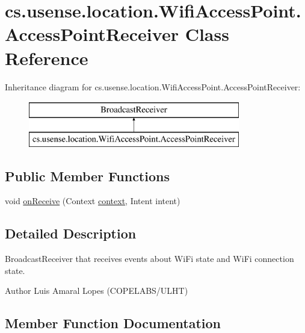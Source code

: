 \hypertarget{classcs_1_1usense_1_1location_1_1_wifi_access_point_1_1_access_point_receiver}{}\section{cs.\+usense.\+location.\+Wifi\+Access\+Point.\+Access\+Point\+Receiver Class Reference}
\label{classcs_1_1usense_1_1location_1_1_wifi_access_point_1_1_access_point_receiver}
Inheritance diagram for cs.\+usense.\+location.\+Wifi\+Access\+Point.\+Access\+Point\+Receiver\+:\begin{figure}[H]
\begin{center}
\leavevmode
\includegraphics[height=2.000000cm]{classcs_1_1usense_1_1location_1_1_wifi_access_point_1_1_access_point_receiver}
\end{center}
\end{figure}
\subsection*{Public Member Functions}
\begin{DoxyCompactItemize}
\item 
void \hyperlink{classcs_1_1usense_1_1location_1_1_wifi_access_point_1_1_access_point_receiver_a839a8d372beffef68220da9bf47dd39e}{on\+Receive} (Context \hyperlink{classcs_1_1usense_1_1location_1_1_wifi_access_point_a915b21207eb4aaed1293221cd1fc5b19}{context}, Intent intent)
\end{DoxyCompactItemize}


\subsection{Detailed Description}
Broadcast\+Receiver that receives events about Wi\+Fi state and Wi\+Fi connection state. \begin{DoxyAuthor}{Author}
Luis Amaral Lopes (C\+O\+P\+E\+L\+A\+B\+S/\+U\+L\+H\+T) 
\end{DoxyAuthor}


\subsection{Member Function Documentation}
\hypertarget{classcs_1_1usense_1_1location_1_1_wifi_access_point_1_1_access_point_receiver_a839a8d372beffef68220da9bf47dd39e}{}

